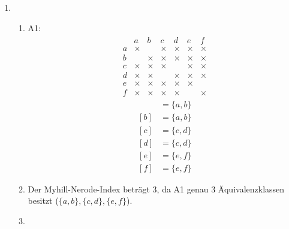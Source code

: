 \begin{enumerate}[1.]
  \item
    \begin{enumerate}
      \item A1:
        \begin{align*}
          \begin{matrix}
              & a      & b      & c      & d      & e      & f\\
            a & \times &        & \times & \times & \times & \times\\
            b &        & \times & \times & \times & \times & \times\\
            c & \times & \times & \times &        & \times & \times\\
            d & \times & \times &        & \times & \times & \times\\
            e & \times & \times & \times & \times & \times & \\
            f & \times & \times & \times & \times &        & \times
          \end{matrix}
        \end{align*}
        \begin{align*}
          [a] & = \{ a, b \}\\
          [b] & = \{ a, b \}\\
          [c] & = \{ c, d \}\\
          [d] & = \{ c, d \}\\
          [e] & = \{ e, f \}\\
          [f] & = \{ e, f \}
        \end{align*}

      \item Der Myhill-Nerode-Index beträgt $3$, da A1 genau $3$
        Äquivalenzklassen besitzt ($\{a,b\}, \{c,d\}, \{e,f\}$).

      \item \
        \begin{center}
        \end{center}


\end{enumerate}
\end{enumerate}
